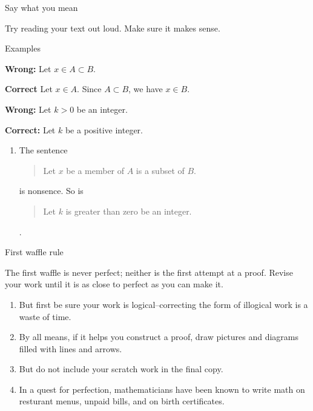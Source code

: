 \documentclass[professionalfonts]{beamer}%
\newenvironment{handlist}{
  \begin{enumerate}[\leftthumbsup]
    \addtolength{\itemsep}{-0.3\itemsep}}
  {\end{enumerate}}
\begin{document}
\begin{frame}[fragile]{Say what you mean}{}%

Try reading your text out loud. Make sure it makes sense.

\begin{block}{Examples}

\textbf{Wrong:} Let \(x \in A \subset B\).



\textbf{Correct} Let \(x \in A\). Since \(A \subset B\), we have \(x \in B\).

\vspace{0.1in}

\textbf{Wrong:}   Let \(k > 0\) be an integer.

\textbf{Correct:} Let \(k\) be a positive integer.

\end{block}

\begin{handlist}
\item The sentence
\begin{quote} Let \(x \) be a member of \(A\) is a subset of \(B\). \end{quote}
is nonsence. So is
\begin{quote} Let \(k\) is  greater than zero be an integer. \end{quote}.

\end{handlist}
\vfill 
\end{frame}
\begin{frame}[fragile]{First waffle rule}{}%

The first waffle is never perfect; neither is the first attempt at a proof. Revise your work until it is 
as close to perfect as you can make it.

\begin{handlist}
\item But first be sure your work is logical--correcting the form of illogical work is a waste of time.

\item By all means, if it helps you construct a proof, draw pictures and
diagrams filled with lines and arrows.  

\item But do not include your scratch work in the final copy.

\item In a quest for perfection, mathematicians have been known to write math on resturant menus, unpaid bills, and on birth certificates.
\end{handlist}

\end{frame}
\end{document}
